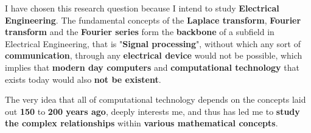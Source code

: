 

{I have chosen this research question because I intend to study \textbf{Electrical Engineering}. The fundamental concepts of the \textbf{Laplace transform}, \textbf{Fourier transform} and the \textbf{Fourier series} form the \textbf{backbone} of a subfield in Electrical Engineering, that is "\textbf{Signal processing}", without which any sort of \textbf{communication}, through any \textbf{electrical device} would not be possible, which implies that \textbf{modern day computers} and \textbf{computational technology} that exists today would also \textbf{not be existent}.}

{The very idea that all of computational technology depends on the concepts laid out \textbf{150} to \textbf{200 years ago}, deeply interests me, and thus has led me to \textbf{study the complex relationships} within \textbf{various mathematical concepts}.}


